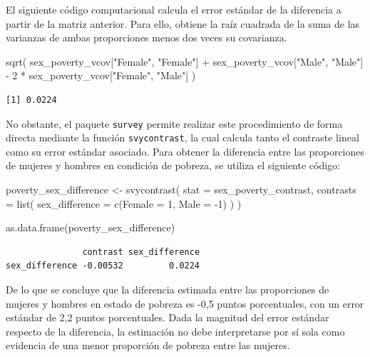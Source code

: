 \documentclass[
  spanish,
  11pt,
  letterpaper,
  oneside,
  open=any]{scrbook}
\newenvironment{Shaded}{\begin{snugshade}}{\end{snugshade}}
\newcommand{\AttributeTok}[1]{\textcolor[rgb]{0.40,0.45,0.13}{#1}}
\newcommand{\DecValTok}[1]{\textcolor[rgb]{0.68,0.00,0.00}{#1}}
\newcommand{\FunctionTok}[1]{\textcolor[rgb]{0.28,0.35,0.67}{#1}}
\newcommand{\NormalTok}[1]{\textcolor[rgb]{0.00,0.23,0.31}{#1}}
\newcommand{\OtherTok}[1]{\textcolor[rgb]{0.00,0.23,0.31}{#1}}
\newcommand{\SpecialCharTok}[1]{\textcolor[rgb]{0.37,0.37,0.37}{#1}}
\newcommand{\StringTok}[1]{\textcolor[rgb]{0.13,0.47,0.30}{#1}}
\begin{document}
El siguiente código computacional calcula el error estándar de la
diferencia a partir de la matriz anterior. Para ello, obtiene la raíz
cuadrada de la suma de las varianzas de ambas proporciones menos dos
veces su covarianza.

\begin{Shaded}
\begin{Highlighting}[]
\FunctionTok{sqrt}\NormalTok{(}
\NormalTok{  sex\_poverty\_vcov[}\StringTok{"Female"}\NormalTok{, }\StringTok{"Female"}\NormalTok{] }\SpecialCharTok{+}
\NormalTok{    sex\_poverty\_vcov[}\StringTok{"Male"}\NormalTok{, }\StringTok{"Male"}\NormalTok{] }\SpecialCharTok{{-}}
    \DecValTok{2} \SpecialCharTok{*}\NormalTok{ sex\_poverty\_vcov[}\StringTok{"Female"}\NormalTok{, }\StringTok{"Male"}\NormalTok{]}
\NormalTok{)}
\end{Highlighting}
\end{Shaded}

\begin{verbatim}
[1] 0.0224
\end{verbatim}

No obstante, el paquete \texttt{survey} permite realizar este
procedimiento de forma directa mediante la función \texttt{svycontrast},
la cual calcula tanto el contraste lineal como su error estándar
asociado. Para obtener la diferencia entre las proporciones de mujeres y
hombres en condición de pobreza, se utiliza el siguiente código:

\begin{Shaded}
\begin{Highlighting}[]
\NormalTok{poverty\_sex\_difference }\OtherTok{\textless{}{-}} \FunctionTok{svycontrast}\NormalTok{(}
  \AttributeTok{stat =}\NormalTok{ sex\_poverty\_contrast,}
  \AttributeTok{contrasts =} \FunctionTok{list}\NormalTok{(}
    \AttributeTok{sex\_difference =} \FunctionTok{c}\NormalTok{(}\AttributeTok{Female =} \DecValTok{1}\NormalTok{, }\AttributeTok{Male =} \SpecialCharTok{{-}}\DecValTok{1}\NormalTok{)}
\NormalTok{  )}
\NormalTok{)}

\FunctionTok{as.data.frame}\NormalTok{(poverty\_sex\_difference)}
\end{Highlighting}
\end{Shaded}

\begin{verbatim}
               contrast sex_difference
sex_difference -0.00532         0.0224
\end{verbatim}

De lo que se concluye que la diferencia estimada entre las proporciones
de mujeres y hombres en estado de pobreza es -0,5 puntos porcentuales,
con un error estándar de 2,2 puntos porcentuales. Dada la magnitud del
error estándar respecto de la diferencia, la estimación no debe
interpretarse por sí sola como evidencia de una menor proporción de
pobreza entre las mujeres.
\end{document}
